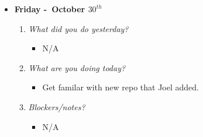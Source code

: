 \begin{itemize}
  \item[] \textbf{\large Friday -\ October \(30^{th}\)}
  \begin{enumerate}
    \item \textsl{What did you do yesterday?}
    \begin{itemize}
      \item N/A
    \end{itemize}
    \item \textsl{What are you doing today?}
    \begin{itemize}
      \item Get familar with new repo that Joel added.
    \end{itemize}
    \item \textsl{Blockers/notes?}
    \begin{itemize}
      \item N/A
    \end{itemize}
  \end{enumerate}
\end{itemize}

